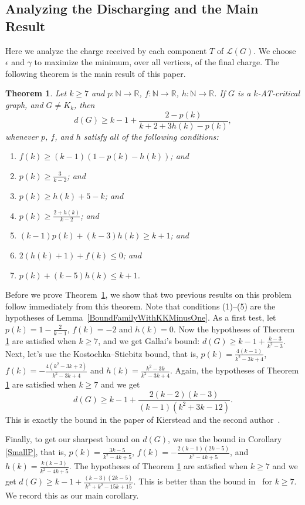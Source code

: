 \documentclass[12pt]{article}
\theoremstyle{plain}
\newtheorem{thm}{Theorem}[section]
\theoremstyle{definition}
\theoremstyle{remark}
\newcommand{\fancy}[1]{\mathcal{#1}}
\newcommand{\IN}{\mathbb{N}}
\newcommand{\IR}{\mathbb{R}}
\renewcommand{\L}{\fancy{L}}
\newcommand{\func}[3]{#1\colon #2 \rightarrow #3}
\begin{document}
\subsection{Analyzing the Discharging and the Main Result}
\label{discharging-analyzing}
Here we analyze the charge received by each component $T$ of $\L(G)$.  We
choose $\epsilon$ and $\gamma$ to maximize the minimum, over all vertices, of
the final charge.  The following theorem is the main result of this paper.

\begin{thm}\label{UberTheorem}
	Let $k \ge 7$ and $\func{p}{\IN}{\IR}$, $\func{f}{\IN}{\IR}$, $\func{h}{\IN}{\IR}$.  If $G$ is a $k$-AT-critical graph, and $G\ne K_k$, then 
	\[d(G) \ge k-1 + \frac{2-p(k)}{k+2 + 3h(k) - p(k)},\]
	whenever $p$, $f$, and $h$ satisfy all of the following conditions:
	\begin{enumerate}
	\item $f(k) \ge (k-1)(1- p(k) - h(k))$; and	
	    \item $p(k) \ge \frac{3}{k-2}$; and
		\item $p(k) \ge h(k) + 5 - k$; and
		\item $p(k) \ge \frac{2+h(k)}{k-2}$; and
		\item $(k-1)p(k) + (k-3)h(k) \ge k+1$; and
		\item $2(h(k) + 1) + f(k) \le 0$; and
		\item $p(k) + (k-5)h(k) \le k+1$.
	\end{enumerate}
\end{thm}

Before we prove Theorem~\ref{UberTheorem}, we show that two previous results on
this problem follow immediately from this theorem.  Note that conditions
(1)--(5) are the hypotheses of Lemma~\ref{BoundFamilyWithKKMinusOne}.  As a
first test, let $p(k) = 1 - \frac{2}{k-1}$, $f(k) = -2$ and $h(k) = 0$.  Now
the hypotheses of Theorem \ref{UberTheorem} are satisfied when $k\ge7$, and we
get Gallai's bound: $d(G) \ge k-1 + \frac{k-3}{k^2-3}$.  Next, let's use the
Kostochka--Stiebitz bound, that is, $p(k) = \frac{4(k-1)}{k^2 - 3k + 4}$, $f(k)
= -\frac{4(k^2-3k+2)}{k^2-3k+4}$ and $h(k) = \frac{k^2 - 3k}{k^2-3k+4}$. 
Again, the hypotheses of Theorem \ref{UberTheorem} are satisfied when $k \ge 7$
and we get
%
\[d(G) \ge k-1 + \frac{2(k-2)(k-3)}{(k-1)(k^2 + 3k - 12)}.\]
%
This is exactly the bound in the paper of Kierstead and the second
author~\cite{OreVizing}.  

Finally, to get our sharpest bound on $d(G)$, we use the bound in Corollary
\ref{SmallP}, that is, $p(k) = \frac{3k-5}{k^2 - 4k + 5}$, $f(k) =
-\frac{2(k-1)(2k-5)}{k^2 - 4k + 5}$, and $h(k) = \frac{k(k-3)}{k^2 - 4k + 5}$. 
The hypotheses of Theorem \ref{UberTheorem} are satisfied when $k\ge7$ and we
get $d(G) \ge k-1 + \frac{(k-3)(2k-5)}{k^3 + k^2 - 15k + 15}.$ This is better
than the bound in~\cite{OreVizing} for $k \ge 7$.  We record this as our main
corollary.
\end{document}
